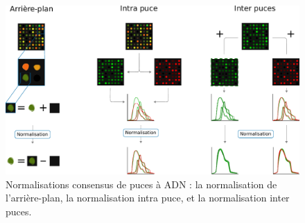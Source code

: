 
\begin{figure}[b]
    \centering
    \includegraphics[width=\textwidth]{img/intro/2_meth_transcripto/intro_2_microarray_normalization.pdf}
    \caption[Normalisations consensus de puces à \acrshort{ADN}]{Normalisations consensus de puces à \acrshort{ADN} : la normalisation de l'arrière-plan, la normalisation intra puce, et la normalisation inter puces.}
    \label{fig:intro_microarray_normalization}
\end{figure}

